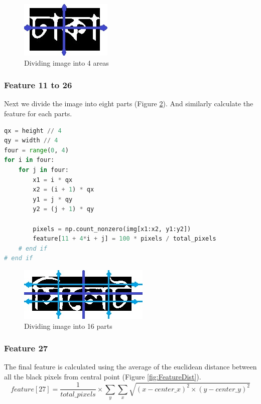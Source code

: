 \documentclass{standalone}
\begin{document}
\begin{figure}
\centering
\includegraphics{./img/feature/fours}
\caption{Dividing image into 4 areas}
\label{fig:FeatureFours}
\end{figure}

\subsubsection{Feature 11 to 26}
Next we divide the image into eight parts (Figure \ref{fig:FeatureEights}). And similarly calculate the feature for each parts.
\begin{lstlisting}[language=Python]
qx = height // 4
qy = width // 4
four = range(0, 4)
for i in four:
    for j in four:
        x1 = i * qx
        x2 = (i + 1) * qx
        y1 = j * qy
        y2 = (j + 1) * qy

        pixels = np.count_nonzero(img[x1:x2, y1:y2])
        feature[11 + 4*i + j] = 100 * pixels / total_pixels
    # end if
# end if
\end{lstlisting}

\begin{figure}
\centering
\includegraphics{./img/feature/eights}
\caption{Dividing image into 16 parts}
\label{fig:FeatureEights}
\end{figure}

\subsubsection{Feature 27}
The final feature is calculated using the average of the euclidean distance between all the black pixels from central point (Figure \ref{fig:FeatureDist}).
\begin{equation}
feature[27] = \dfrac{1}{total\_pixels} \times \sum_{y}{\sum_{x}{ \sqrt{(x-center\_x)^2 \times (y-center\_y)^2} }}
\end{equation}
\end{document}

